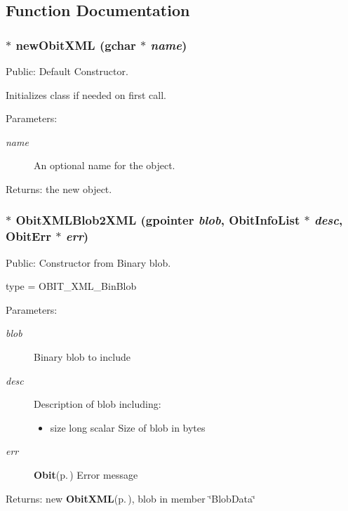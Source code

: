 \subsection{Function Documentation}
\subsubsection{$\ast$ new\-Obit\-XML (gchar $\ast$ {\em name})}\label{ObitXML_8h_a15}


Public: Default Constructor. 

Initializes class if needed on first call. \begin{Desc}
\item[Parameters:]
\begin{description}
\item[{\em name}]An optional name for the object. \end{description}
\end{Desc}
\begin{Desc}
\item[Returns:]the new object. \end{Desc}
\subsubsection{$\ast$ Obit\-XMLBlob2XML (gpointer {\em blob}, {\bf Obit\-Info\-List} $\ast$ {\em desc}, {\bf Obit\-Err} $\ast$ {\em err})}\label{ObitXML_8h_a30}


Public: Constructor from Binary blob. 

type = OBIT\_\-XML\_\-Bin\-Blob \begin{Desc}
\item[Parameters:]
\begin{description}
\item[{\em blob}]Binary blob to include \item[{\em desc}]Description of blob including: \begin{itemize}
\item size long scalar Size of blob in bytes \end{itemize}
\item[{\em err}]{\bf Obit}{\rm (p.\,\pageref{structObit})} Error message \end{description}
\end{Desc}
\begin{Desc}
\item[Returns:]new {\bf Obit\-XML}{\rm (p.\,\pageref{structObitXML})}, blob in member \char`\"{}Blob\-Data\char`\"{} \end{Desc}
